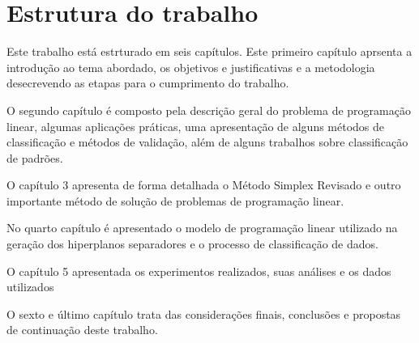 \section{Estrutura do trabalho}
Este trabalho está estrturado em seis capítulos. Este primeiro capítulo aprsenta a introdução ao tema abordado, os objetivos e justificativas e a metodologia desecrevendo as etapas para o cumprimento do trabalho.

O segundo capítulo é composto pela descrição geral do problema de programação linear, algumas aplicações práticas, uma apresentação de alguns métodos de classificação e métodos de validação, além de alguns trabalhos sobre classificação de padrões.

O capítulo 3 apresenta de forma detalhada o Método Simplex Revisado e outro importante método de solução de problemas de programação linear.

No quarto capítulo é apresentado o modelo de programação linear utilizado na geração dos hiperplanos separadores e o processo de classificação de dados.

O capítulo 5 apresentada os experimentos realizados, suas análises e os dados utilizados

O sexto e último capítulo trata das considerações finais, conclusões e propostas de continuação deste trabalho.
